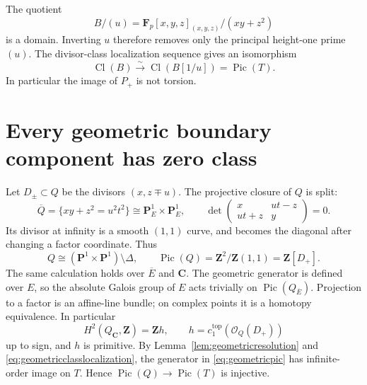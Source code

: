 \documentclass[11pt,a4paper]{article}
\theoremstyle{remark}
\newcommand{\Z}{\mathbf Z}
\newcommand{\C}{\mathbf C}
\newcommand{\F}{\mathbf F}
\newcommand{\PP}{\mathbf P}
\newcommand{\OO}{\mathcal O}
\newcommand{\Pic}{\operatorname{Pic}}
\newcommand{\Cl}{\operatorname{Cl}}
\begin{document}
The quotient
\[
 B/(u)=\F_p[x,y,z]_{(x,y,z)}/(xy+z^2)
\]
is a domain. Inverting \(u\) therefore removes only the principal
height-one prime \((u)\). The divisor-class localization sequence
gives an isomorphism
\begin{equation}\label{eq:geometricclasslocalization}
 \Cl(B)\xrightarrow{\;\sim\;}\Cl(B[1/u])=\Pic(T).
\end{equation}
In particular the image of \(P_+\) is not torsion.

\section{Every geometric boundary component has zero class}

Let \(D_\pm\subset Q\) be the divisors \((x,z\mp u)\).
The projective closure of \(Q\) is split:
\[
 \overline Q=\{xy+z^2=u^2t^2\}\cong\PP^1_E\times\PP^1_E,
 \qquad
 \det\begin{pmatrix}x&ut-z\\ut+z&y\end{pmatrix}=0.
\]
Its divisor at infinity is a smooth \((1,1)\) curve, and becomes
the diagonal after changing a factor coordinate. Thus
\begin{equation}\label{eq:geometricpic}
 Q\cong(\PP^1\times\PP^1)\setminus\Delta,\qquad
 \Pic(Q)=\Z^2/\Z(1,1)=\Z[D_+].
\end{equation}
The same calculation holds over \(\overline E\) and \(\C\).
The geometric generator is defined over \(E\), so the absolute
Galois group of \(E\) acts trivially on \(\Pic(Q_{\overline E})\).
Projection to a factor is an affine-line bundle; on complex points
it is a homotopy equivalence. In particular
\[
 H^2(Q_{\C},\Z)=\Z h,\qquad
 h=c_1^{\mathrm{top}}(\OO_Q(D_+))
\]
up to sign, and \(h\) is primitive.
By Lemma~\ref{lem:geometricresolution} and
\eqref{eq:geometricclasslocalization}, the generator in
\eqref{eq:geometricpic} has infinite-order image on \(T\).
Hence \(\Pic(Q)\to\Pic(T)\) is injective.
\end{document}
